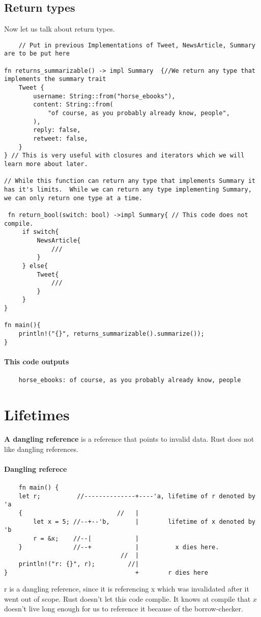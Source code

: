 \subsection{Return types}
Now let us talk about return types.
\begin{lstlisting}
    // Put in previous Implementations of Tweet, NewsArticle, Summary are to be put here

fn returns_summarizable() -> impl Summary  {//We return any type that implements the summary trait
    Tweet {
        username: String::from("horse_ebooks"),
        content: String::from(
            "of course, as you probably already know, people",
        ),
        reply: false,
        retweet: false,
    }
} // This is very useful with closures and iterators which we will learn more about later.

// While this function can return any type that implements Summary it has it's limits.  While we can return any type implementing Summary, we can only return one type at a time.

 fn return_bool(switch: bool) ->impl Summary{ // This code does not compile.
     if switch{
         NewsArticle{
             ///
         }
     } else{
         Tweet{
             ///
         }
     }
}

fn main(){
    println!("{}", returns_summarizable().summarize());
}
\end{lstlisting}
\paragraph*{This code outputs}\begin{lstlisting}
    horse_ebooks: of course, as you probably already know, people
\end{lstlisting}



\section{Lifetimes}
\begin{definition}
    \textbf{A dangling reference} is a reference that points to invalid data. Rust does not like dangling references.
\end{definition}
\paragraph*{Dangling referece}\begin{lstlisting}
    fn main() {
    let r;          //--------------+----'a, lifetime of r denoted by 'a
    {                          //   |
        let x = 5; //--+--'b,       |        lifetime of x denoted by 'b
        r = &x;    //--|            |
    }              //--+            |          x dies here.
                                //  |         
    println!("r: {}", r);         //|
}                                   +        r dies here 
\end{lstlisting}
r is a dangling reference, since it is referencing x which was invalidated after it went out of scope.
Rust doesn't let this code complie. It knows at compile that $x$ doesn't live long enough for us to reference it because of the borrow-checker.


